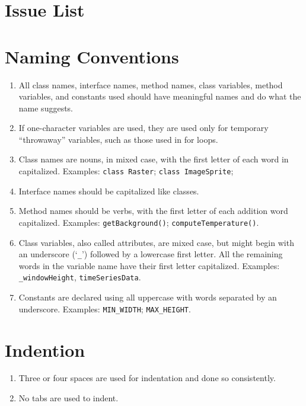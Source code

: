 \section {Issue List}
\section*{Naming Conventions}\begin{enumerate}[resume]
\item All class names, interface names, method names, class variables, method variables, and constants used should have meaningful names and do what the name suggests.
\item If one-character variables are used, they are used only for temporary ``throwaway'' variables, such as those used in for loops.
\item Class names are nouns, in mixed case, with the first letter of each word in capitalized. Examples: \texttt{class Raster}; \texttt{class ImageSprite};
\item Interface names should be capitalized like classes.
\item Method names should be verbs, with the first letter of each addition word capitalized. Examples: \texttt{getBackground()}; \texttt{computeTemperature()}.
\item Class variables, also called attributes, are mixed case, but might begin with an underscore (`\texttt{\_}') followed by a lowercase first letter. All the remaining words in the variable name have their first letter capitalized. Examples: \texttt{\_windowHeight}, \texttt{timeSeriesData}.
\item Constants are declared using all uppercase with words separated by an underscore. Examples: \texttt{MIN\_WIDTH}; \texttt{MAX\_HEIGHT}.
\end{enumerate}

\section*{Indention}\begin{enumerate}[resume]
\item Three or four spaces are used for indentation and done so consistently.
\item No tabs are used to indent.
\end{enumerate}

